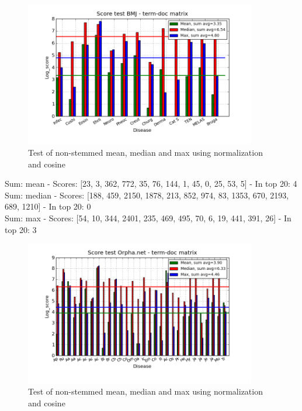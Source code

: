 \begin{figure}[h!]
        \begin{center}
          \includegraphics[width=0.9\textwidth]{barcharts/termDoc_bmj_hist_3000_sum_mea_med_max.png}
        \end{center}
        \caption{Test of non-stemmed mean, median and max using normalization and cosine}
        \label{termDoc_bmj_hist_3000_sum_mea_med_max}
\end{figure}

Sum: mean - Scores: [23, 3, 362, 772, 35, 76, 144, 1, 45, 0, 25, 53, 5] - In top 20: 4 \\
Sum: median - Scores: [188, 459, 2150, 1878, 213, 852, 974, 83, 1353, 670, 2193, 689, 1210] - In top 20: 0 \\
Sum: max - Scores: [54, 10, 344, 2401, 235, 469, 495, 70, 6, 19, 441, 391, 26] - In top 20: 3

\begin{figure}[h!]
        \begin{center}
          \includegraphics[width=0.9\textwidth]{barcharts/termDoc_orphan_hist_3000_ns_mea_med_max_sum.png}
        \end{center}
        \caption{Test of non-stemmed mean, median and max using normalization and cosine}
        \label{termDoc_orphan_hist_3000_ns_mea_med_max_sum}
\end{figure}
 
